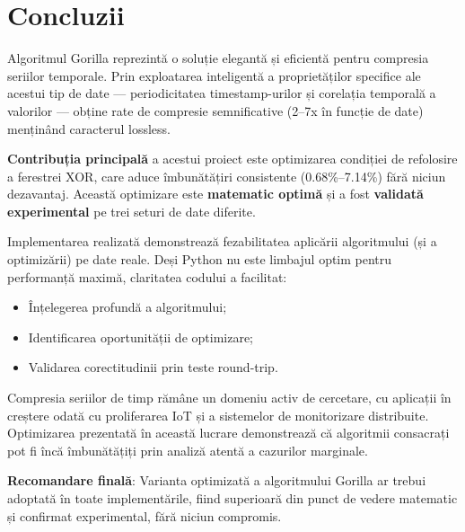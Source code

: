 \section{Concluzii}

Algoritmul Gorilla reprezintă o soluție elegantă și eficientă pentru compresia seriilor temporale. Prin exploatarea inteligentă a proprietăților specifice ale acestui tip de date --- periodicitatea timestamp-urilor și corelația temporală a valorilor --- obține rate de compresie semnificative (2--7x în funcție de date) menținând caracterul lossless.

\textbf{Contribuția principală} a acestui proiect este optimizarea condiției de refolosire a ferestrei XOR, care aduce îmbunătățiri consistente (0.68\%--7.14\%) fără niciun dezavantaj. Această optimizare este \textbf{matematic optimă} și a fost \textbf{validată experimental} pe trei seturi de date diferite.

Implementarea realizată demonstrează fezabilitatea aplicării algoritmului (și a optimizării) pe date reale. Deși Python nu este limbajul optim pentru performanță maximă, claritatea codului a facilitat:
\begin{itemize}
    \item Înțelegerea profundă a algoritmului;
    \item Identificarea oportunității de optimizare;
    \item Validarea corectitudinii prin teste round-trip.
\end{itemize}

Compresia seriilor de timp rămâne un domeniu activ de cercetare, cu aplicații în creștere odată cu proliferarea IoT și a sistemelor de monitorizare distribuite. Optimizarea prezentată în această lucrare demonstrează că algoritmii consacrați pot fi încă îmbunătățiți prin analiză atentă a cazurilor marginale.

\textbf{Recomandare finală}: Varianta optimizată a algoritmului Gorilla ar trebui adoptată în toate implementările, fiind superioară din punct de vedere matematic și confirmat experimental, fără niciun compromis.